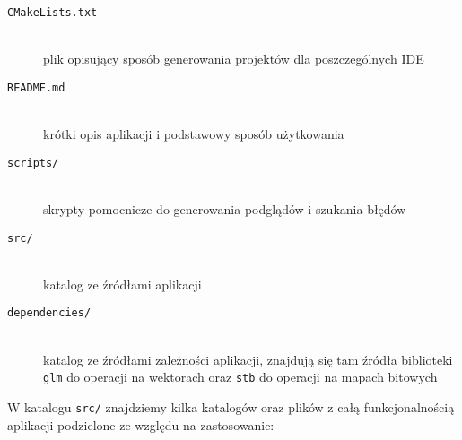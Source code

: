 \documentclass[../main.tex]{subfiles}
\begin{document}
\begin{description}
    \item[\texttt{CMakeLists.txt}] \hfill\\ 
    plik opisujący sposób generowania projektów dla poszczególnych IDE 
    
    \item[\texttt{README.md}] \hfill\\ 
    krótki opis aplikacji i podstawowy sposób użytkowania 
    
    \item[\texttt{scripts/}] \hfill\\ 
    skrypty pomocnicze do generowania podglądów i szukania błędów
    
    \item[\texttt{src/}] \hfill\\ 
    katalog ze źródłami aplikacji
    
    \item[\texttt{dependencies/}] \hfill\\ 
    katalog ze źródłami zależności aplikacji, znajdują się tam źródła biblioteki \texttt{glm} \cite{GLMProject} do operacji na wektorach oraz \texttt{stb} \cite{STBProject} do operacji na mapach bitowych
\end{description}

\noindent W katalogu \texttt{src/} znajdziemy kilka katalogów oraz plików z całą funkcjonalnością aplikacji podzielone ze względu na zastosowanie:
\end{document}
